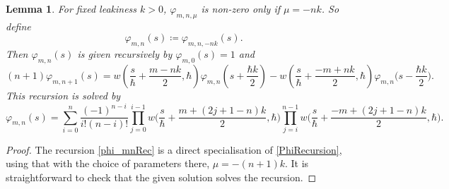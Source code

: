 \documentclass[10pt,a4paper,oneside,no-math,reqno]{amsart}%
\theoremstyle{plain}
\newtheorem{lemma}[theorem]{Lemma}
\theoremstyle{definition}
\theoremstyle{remark}
\numberwithin{equation}{section}
\renewcommand{\phi}{\varphi}
\newcommand{\mb}[1]{\mathbb{#1}}
\newcommand{\mc}[1]{\mathcal{#1}}
\newcommand{\1}{\mathds{1}}
\newcommand{\Z}{\mb{Z}}
\newcommand{\<}{\langle}
\renewcommand{\>}{\rangle}
\newcommand{\del}{\partial}
\DeclareMathOperator{\ad}{ad}
\begin{document}

\begin{lemma}
	For fixed leakiness $ k>0$, $ \phi_{m,n,\mu}$ is non-zero only if $ \mu = - nk$. So define
	\begin{equation}\label{phi_m}
		\phi_{m,n}(s)
		\coloneqq
		\phi_{m,n,-nk}(s) .
	\end{equation}
	Then $ \phi_{m,n}(s)$ is given recursively by $ \phi_{m,0}(s) = 1$ and
	\begin{equation}\label{phi_mnRec}
		(n+1) \phi_{m,n+1} (s) 
		=
		w (\frac{s}{\hbar} + \frac{m-nk}{2}, \hbar ) \phi_{m,n} ( s + \frac{\hbar k}{2}) - w ( \frac{s}{\hbar} + \frac{-m+nk}{2}, \hbar ) \phi_{m,n} \big( s - \frac{\hbar k}{2}\big) .
	\end{equation}
	This recursion is solved by
	\begin{equation}\label{phi_mn}
		\phi_{m,n} (s )
		=
		\sum_{i=0}^n \frac{(-1)^{n-i}}{i!(n-i)!} \prod_{j=0}^{i-1} w \big( \frac{s}{\hbar} + \frac{m + (2j+1-n)k}{2}, \hbar \big) \prod_{j=i}^{n-1} w \big( \frac{s}{\hbar} + \frac{-m + (2j+1-n)k}{2}, \hbar \big) .
\end{equation}
\end{lemma}

\begin{proof}
	The recursion \eqref{phi_mnRec} is a direct specialisation of \cref{PhiRecursion}, using that with the choice of parameters there, $ \mu = -(n+1)k$. It is straightforward to check that the given solution solves the recursion.
\end{proof}
\end{document}
